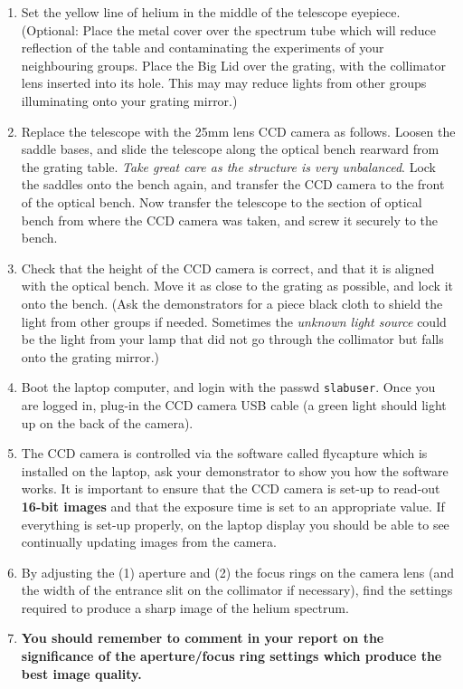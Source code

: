 \documentclass[12pt]{article}
\begin{document}
\begin{enumerate}

\item Set the yellow line of helium in the middle of the telescope eyepiece. (Optional: Place the metal cover over the spectrum tube which will reduce reflection of the table and contaminating the experiments of your neighbouring groups. Place the Big Lid over the grating, with the collimator lens inserted into its hole. This may may reduce lights from other groups illuminating onto your grating mirror.)

\item Replace the telescope with the 25mm lens CCD camera as follows. Loosen the saddle bases, and slide the telescope along the optical bench rearward from the grating table. {\sl Take great care as the structure is very unbalanced}. Lock the saddles onto the bench again, and transfer the CCD camera to the front of the optical bench. Now transfer the telescope to the section of optical bench from where the CCD camera was taken, and screw it securely to the bench.

\item Check that the height of the CCD camera is correct, and that it is aligned with the optical bench. Move it as close to the grating as possible, and lock it onto the bench. (Ask the demonstrators for a piece black cloth to shield the light from other groups if needed. Sometimes the {\it unknown light source} could be the light from your lamp that did not go through the collimator but falls onto the grating mirror.)

\item Boot the laptop computer, and login with the passwd {\tt slabuser}. Once you are logged in, plug-in the CCD camera USB cable (a green light should light up on the back of the camera).

\item The CCD camera is controlled via the software called {\sc flycapture} which is installed on the laptop, ask your demonstrator to show you how the software works. It is important to ensure that the CCD camera is set-up to read-out {\bf 16-bit images} and that the exposure time is set to an appropriate value. If everything is set-up properly, on the laptop display you should be able to see continually updating images from the camera. 

\item By adjusting the (1) aperture and (2) the focus rings on the camera lens (and the width of the entrance slit on the collimator if necessary), find the settings required to produce a sharp image of the helium spectrum.

\item {\bf You should remember to comment in your report on the significance of the aperture/focus ring settings which produce the best image quality.}

\end{enumerate}
\end{document}
